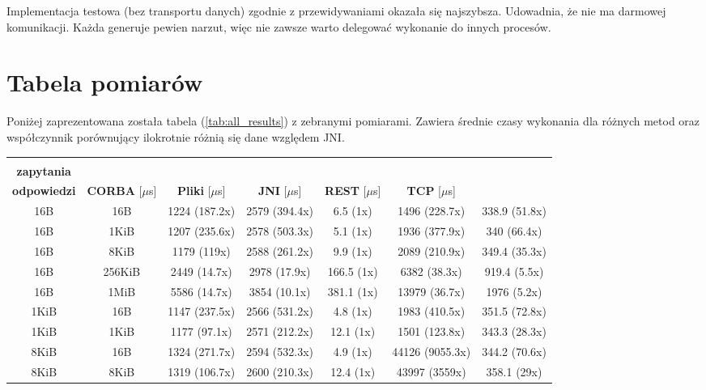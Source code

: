 Implementacja testowa (bez transportu danych) zgodnie z przewidywaniami okazała się najszybsza. Udowadnia, że nie ma darmowej komunikacji. Każda generuje pewien narzut, więc nie zawsze warto delegować wykonanie do innych procesów.


\section{Tabela pomiarów}

Poniżej zaprezentowana została tabela (\ref{tab:all_results}) z zebranymi pomiarami. Zawiera średnie czasy wykonania dla różnych metod oraz współczynnik porównujący ilokrotnie różnią się dane względem JNI.

\begin{longtable}{|c|c|c|c|c|c|c|}
    \hline
    \begin{tabular}{@{}c@{}} \textbf{Rozmiar} \\ \textbf{zapytania} \end{tabular} & \begin{tabular}{@{}c@{}} \textbf{Rozmiar} \\ \textbf{odpowiedzi} \end{tabular} & \textbf{CORBA} [$\mu$s] & \textbf{Pliki} [$\mu$s] & \textbf{JNI} [$\mu$s] & \textbf{REST} [$\mu$s] & \textbf{TCP} [$\mu$s] \\
    \hline
    16B & 16B & 1224 (187.2x) & 2579 (394.4x) & 6.5 (1x) & 1496 (228.7x) & 338.9 (51.8x) \\
    16B & 1KiB & 1207 (235.6x) & 2578 (503.3x) & 5.1 (1x) & 1936 (377.9x) & 340 (66.4x) \\
    16B & 8KiB & 1179 (119x) & 2588 (261.2x) & 9.9 (1x) & 2089 (210.9x) & 349.4 (35.3x) \\
    16B & 256KiB & 2449 (14.7x) & 2978 (17.9x) & 166.5 (1x) & 6382 (38.3x) & 919.4 (5.5x) \\
    16B & 1MiB & 5586 (14.7x) & 3854 (10.1x) & 381.1 (1x) & 13979 (36.7x) & 1976 (5.2x) \\
    1KiB & 16B & 1147 (237.5x) & 2566 (531.2x) & 4.8 (1x) & 1983 (410.5x) & 351.5 (72.8x) \\
    1KiB & 1KiB & 1177 (97.1x) & 2571 (212.2x) & 12.1 (1x) & 1501 (123.8x) & 343.3 (28.3x) \\
    8KiB & 16B & 1324 (271.7x) & 2594 (532.3x) & 4.9 (1x) & 44126 (9055.3x) & 344.2 (70.6x) \\
    8KiB & 8KiB & 1319 (106.7x) & 2600 (210.3x) & 12.4 (1x) & 43997 (3559x) & 358.1 (29x) \\

\end{longtable}
